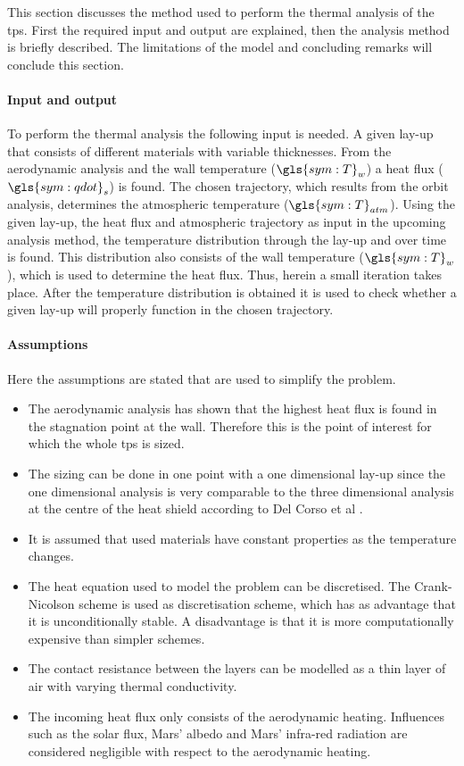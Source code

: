 This section discusses the method used to perform the thermal analysis of the \gls{tps}. First the required input and output are explained, then the analysis method is briefly described. The limitations of the model and concluding remarks will conclude this section.

\paragraph{Input and output}
To perform the thermal analysis the following input is needed. A given lay-up that consists of different materials with variable thicknesses. From the aerodynamic analysis and the wall temperature ($\gls{sym:T}_w$) a heat flux ($\gls{sym:qdot}_s$) is found. The chosen trajectory, which results from the orbit analysis, determines the atmospheric temperature ($\gls{sym:T}_{atm}$). Using the given lay-up, the heat flux and atmospheric trajectory as input in the upcoming analysis method, the temperature distribution through the lay-up and over time is found. This distribution also consists of the wall temperature ($\gls{sym:T}_w$), which is used to determine the heat flux. Thus, herein a small iteration takes place. After the temperature distribution is obtained it is used to check whether a given lay-up will properly function in the chosen trajectory.

\paragraph{Assumptions}
Here the assumptions are stated that are used to simplify the problem.
\begin{itemize}
	\item The aerodynamic analysis has shown that the highest heat flux is found in the stagnation point at the wall. Therefore this is the point of interest for which the whole \gls{tps} is sized.
	\item The sizing can be done in one point with a one dimensional lay-up since the one dimensional analysis is very comparable to the three dimensional analysis at the centre of the heat shield according to Del Corso et al \cite{Corso2009}.
	\item It is assumed that used materials have constant properties as the temperature changes. 
	\item The heat equation used to model the problem can be discretised. The Crank-Nicolson scheme is used as discretisation scheme, which has as advantage that it is unconditionally stable. A disadvantage is that it is more computationally expensive than simpler schemes.
	\item The contact resistance between the layers can be modelled as a thin layer of air with varying thermal conductivity.
	\item The incoming heat flux only consists of the aerodynamic heating. Influences such as the solar flux, Mars' albedo and Mars' infra-red radiation are considered negligible with respect to the aerodynamic heating.
\end{itemize}


